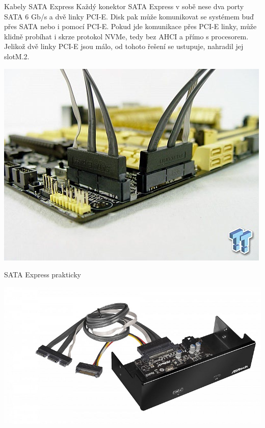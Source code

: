 \documentclass[aspectratio=43]{beamer}
\begin{document}
\begin{frame}{Kabely SATA Express}
	Každý konektor SATA Express v sobě nese dva porty SATA 6 Gb/s a dvě linky PCI-E. Disk pak může komunikovat se systémem buď přes SATA nebo i pomocí PCI-E. 
	Pokud jde komunikace přes PCI-E linky, může klidně probíhat i skrze protokol NVMe, tedy bez AHCI a přímo s procesorem. \\
	Jelikož dvě linky PCI-E jsou málo, od tohoto řešení se ustupuje, nahradil jej slotM.2.
	\begin{center}
		\includegraphics[width=0.6\linewidth]{extrahovane_obrazky/img_2_page19_0.jpeg}
	\end{center}
\end{frame}


\begin{frame}{SATA Express prakticky}
	\begin{center}
		\includegraphics[width=1\linewidth]{extrahovane_obrazky/img_2_page21_0.jpeg}
	\end{center}
	
\end{frame}
\end{document}
